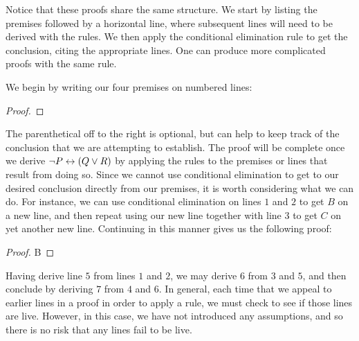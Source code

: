 Notice that these proofs share the same structure.
We start by listing the premises followed by a horizontal line, where subsequent lines will need to be derived with the rules.
We then apply the conditional elimination rule to get the conclusion, citing the appropriate lines.
One can produce more complicated proofs with the same rule.

\begin{earg}
\end{earg}

We begin by writing our four premises on numbered lines:

\begin{proof}
	 \pr{}
	 \pr{}
	 \pr{}
	 
\end{proof}

The parenthetical off to the right is optional, but can help to keep track of the conclusion that we are attempting to establish.
The proof will be complete once we derive $\neg P \leftrightarrow (Q \vee R)$ by applying the rules to the premises or lines that result from doing so.
Since we cannot use conditional elimination to get to our desired conclusion directly from our premises, it is worth considering what we can do.
For instance, we can use conditional elimination on lines $1$ and $2$ to get $B$ on a new line, and then repeat using our new line together with line $3$ to get $C$ on yet another new line. 
Continuing in this manner gives us the following proof:

\begin{proof}
	 \pr{}
	 \pr{}
	 \pr{}
	 
	 {B} 
	 
	 
\end{proof}

Having derive line $5$ from lines $1$ and $2$, we may derive $6$ from $3$ and $5$, and then conclude by deriving $7$ from $4$ and $6$.
In general, each time that we appeal to earlier lines in a proof in order to apply a rule, we must check to see if those lines are live.
However, in this case, we have not introduced any assumptions, and so there is no risk that any lines fail to be live.

